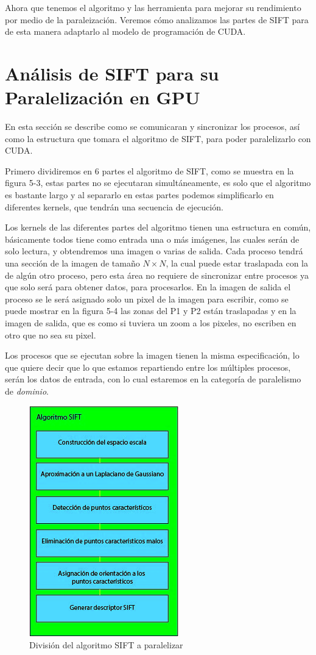 Ahora que tenemos el algoritmo y las herramienta para mejorar su rendimiento por medio de la paraleización. Veremos cómo analizamos las partes de SIFT para de esta manera adaptarlo al modelo de programación de CUDA.
\pagebreak
\section{Análisis de SIFT para su Paralelización en GPU}

En esta sección se describe como se comunicaran y sincronizar los procesos, así como la estructura que tomara el algoritmo de SIFT, para poder paralelizarlo con CUDA. 

Primero dividiremos en 6 partes el algoritmo de SIFT, como se muestra en la figura 5-3, estas partes no se ejecutaran simultáneamente, es solo que el algoritmo es bastante largo y al separarlo en estas partes podemos simplificarlo en diferentes kernels, que tendrán una secuencia de ejecución. 


Los kernels de las diferentes partes del algoritmo tienen una estructura en común, básicamente todos tiene como entrada una o más imágenes, las cuales serán de solo lectura, y obtendremos una imagen o varias de salida. Cada proceso tendrá una sección de la imagen de tamaño  $N \times N$, la cual puede estar traslapada con la de algún otro proceso, pero esta área no requiere de sincronizar entre procesos ya que solo será para obtener datos, para procesarlos. En la imagen de salida el proceso se le será asignado solo un pixel de la imagen para escribir, como se puede mostrar en la figura 5-4 las zonas del P1 y P2 están traslapadas y en la imagen de salida, que es como si tuviera un zoom a los pixeles, no escriben en otro que no sea su pixel. 

\pagebreak
Los procesos que se ejecutan sobre la imagen tienen la misma especificación, lo que quiere decir que lo que estamos repartiendo entre los múltiples procesos, serán los datos de entrada, con lo cual estaremos en la categoría de paralelismo de \textit{dominio}.

\begin{figure}[ph]
			\centering
				\includegraphics[scale=1]{img/SIFTdiv.jpg}
			\caption{División del algoritmo SIFT a paralelizar}
\end{figure}


